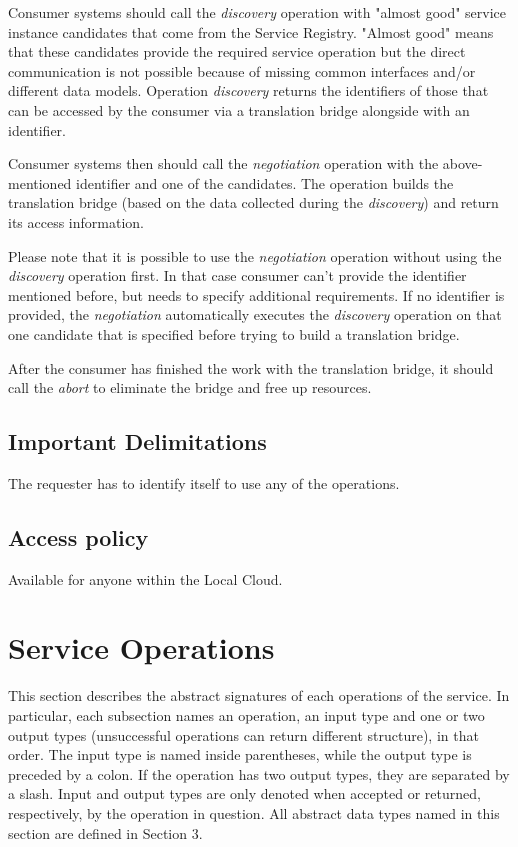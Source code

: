 \documentclass[a4paper]{arrowhead}
\begin{document}
Consumer systems should call the \textit{discovery} operation with "almost good" service instance candidates that come from the Service Registry. "Almost good" means that these candidates provide the required service operation but the direct communication is not possible because of missing common interfaces and/or different data models. Operation \textit{discovery} returns the identifiers of those that can be accessed by the consumer via a translation bridge alongside with an identifier.

Consumer systems then should call the \textit{negotiation} operation with the above-mentioned identifier and one of the candidates. The operation builds the translation bridge (based on the data collected during the \textit{discovery}) and return its access information.

Please note that it is possible to use the \textit{negotiation} operation without using the \textit{discovery} operation first. In that case consumer can't provide the identifier mentioned before, but needs to specify additional requirements. If no identifier is provided, the \textit{negotiation} automatically executes the \textit{discovery} operation on that one candidate that is specified before trying to build a translation bridge.

After the consumer has finished the work with the translation bridge, it should call the \textit{abort} to eliminate the bridge and free up resources.

\subsection{Important Delimitations}
\label{sec:delimitations}

The requester has to identify itself to use any of the operations.

\subsection{Access policy}
\label{sec:accesspolicy}

Available for anyone within the Local Cloud.

\newpage

\section{Service Operations}
\label{sec:functions}

This section describes the abstract signatures of each operations of the service. In particular, each subsection names an operation, an input type and one or two output types (unsuccessful operations can return different structure), in that order.
The input type is named inside parentheses, while the output type is preceded by a colon. If the operation has two output types, they are separated by a slash.
Input and output types are only denoted when accepted or returned, respectively, by the operation in question. All abstract data types named in this section are defined in Section 3.
\end{document}
